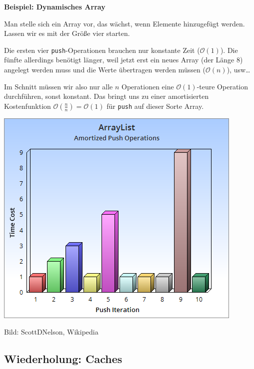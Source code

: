 \documentclass{beamer}
\begin{document}
\begin{frame}
\textbf{Beispiel: Dynamisches Array}\bigskip

Man stelle sich ein Array vor, das wächst, wenn Elemente hinzugefügt werden. Lassen wir es mit der Größe vier starten.\pause\bigskip

Die ersten vier \texttt{push}-Operationen brauchen nur konstante Zeit ($\mathcal{O}(1)$). Die fünfte allerdings benötigt länger, weil jetzt erst ein neues Array (der Länge 8) angelegt werden muss und die Werte übertragen werden müssen ($\mathcal{O}(n)$), usw\dots
\pause\bigskip

Im Schnitt müssen wir also nur alle $n$ Operationen eine $\mathcal{O}(1)$-teure Operation durchführen, sonst konstant. Das bringt uns zu einer amortisierten Kostenfunktion $\mathcal{O}\left(\frac{n}{n}\right) = \mathcal{O}(1)$ für \texttt{push} auf dieser Sorte Array.
\end{frame}


\begin{frame}
\begin{center}
\includegraphics[scale=0.5]{AmortizedPush.png} 
\end{center}
\tiny
Bild: ScottDNelson, Wikipedia
\normalsize
\end{frame}


\subsection{Wiederholung: Caches}
\end{document}
